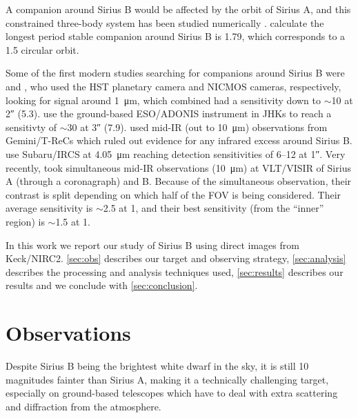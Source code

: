 \documentclass[twocolumn]{aastex631}
\begin{document}
A companion around Sirius B would be affected by the orbit of Sirius A, and this constrained three-body system has been studied numerically \citep{holman_long-term_1999}. \citet{bond_sirius_2017} calculate the longest period stable companion around Sirius B is \qty{1.79}{\year}, which corresponds to a \qty{1.5}{\au} circular orbit.

Some of the first modern studies searching for companions around Sirius B were \citet{schroeder_search_2000} and \citet{kuchner_search_2000}, who used the HST planetary camera and NICMOS cameras, respectively, looking for signal around \qty{1}{\micro\meter}, which combined had a sensitivity down to $\sim$\qty{10}{\jupitermass} at \ang{;;2} (\qty{5.3}{\au}). \citet{bonnet-bidaud_adonis_2008} use the ground-based ESO/ADONIS instrument in JHKs to reach a sensitivty of $\sim$\qty{30}{\jupitermass} at \ang{;;3} (\qty{7.9}{\au}). \citet{skemer_sirius_2011} used mid-IR (out to \qty{10}{\micro\meter}) observations from Gemini/T-ReCs which ruled out evidence for any infrared excess around Sirius B. \citet{thalmann_piercing_2011} use Subaru/IRCS at \qty{4.05}{\micro\meter} reaching detection sensitivities of \qtyrange{6}{12}{\jupitermass} at \ang{;;1}. Very recently, \citet{pathak_high_2021} took simultaneous mid-IR observations (\qty{10}{\micro\meter}) at VLT/VISIR of Sirius A (through a coronagraph) and B. Because of the simultaneous observation, their contrast is split depending on which half of the FOV is being considered. Their average sensitivity is $\sim$\qty{2.5}{\jupitermass} at \qty{1}{\au}, and their best sensitivity (from the ``inner'' region) is $\sim$\qty{1.5}{\jupitermass} at \qty{1}{\au}.

In this work we report our study of Sirius B using direct images from Keck/NIRC2. \autoref{sec:obs} describes our target and observing strategy, \autoref{sec:analysis} describes the processing and analysis techniques used, \autoref{sec:results} describes our results and we conclude with \autoref{sec:conclusion}.

\section{Observations} \label{sec:obs}

Despite Sirius B being the brightest white dwarf in the sky, it is still 10 magnitudes fainter than Sirius A, making it a technically challenging target, especially on ground-based telescopes which have to deal with extra scattering and diffraction from the atmosphere.
\end{document}
